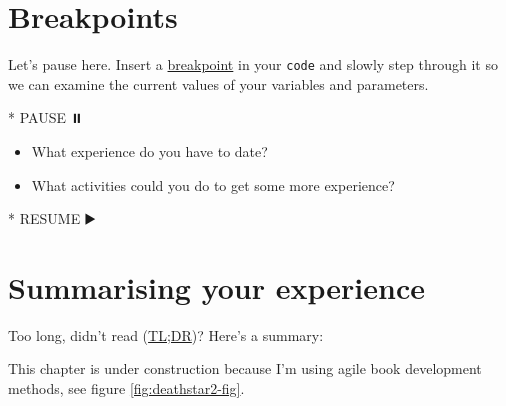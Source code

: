 \documentclass[
]{book}
\newenvironment{Shaded}{\begin{snugshade}}{\end{snugshade}}
\newcommand{\NormalTok}[1]{#1}
\newcommand{\SpecialStringTok}[1]{\textcolor[rgb]{0.31,0.60,0.02}{#1}}
\providecommand{\tightlist}{%
  \setlength{\itemsep}{0pt}\setlength{\parskip}{0pt}}
\begin{document}
\hypertarget{bp5}{%
\section{Breakpoints}\label{bp5}}

Let's pause here. Insert a \href{https://en.wikipedia.org/wiki/Breakpoint}{breakpoint} in your \texttt{code} and slowly step through it so we can examine the current values of your variables and parameters.

\begin{Shaded}
\begin{Highlighting}[]
\SpecialStringTok{* }\NormalTok{PAUSE ⏸️}
\end{Highlighting}
\end{Shaded}

\begin{itemize}
\tightlist
\item
  What experience do you have to date?
\item
  What activities could you do to get some more experience?
\end{itemize}

\begin{Shaded}
\begin{Highlighting}[]
\SpecialStringTok{* }\NormalTok{RESUME ▶️}
\end{Highlighting}
\end{Shaded}

\hypertarget{tldr5}{%
\section{Summarising your experience}\label{tldr5}}

Too long, didn't read (\href{https://en.wiktionary.org/wiki/too_long;_didn\%27t_read}{TL;DR})? Here's a summary:

This chapter is under construction because I'm using agile book development methods, see figure \ref{fig:deathstar2-fig}.
\end{document}
